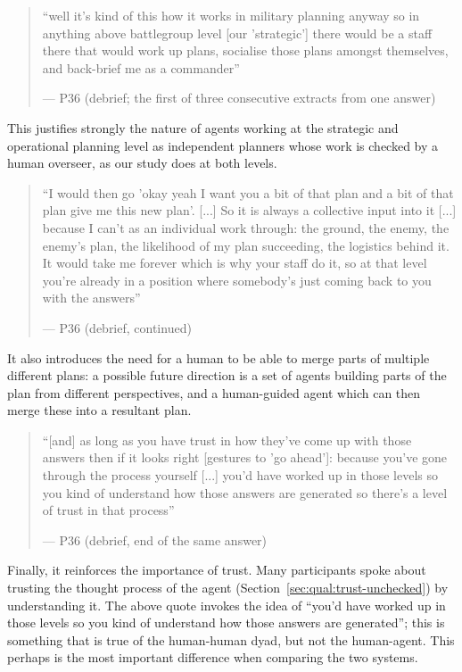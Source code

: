 \begin{quote}\small
``well it's kind of this how it works in military planning anyway so in anything above battlegroup level [our 'strategic'] there would be a staff there that would work up plans, socialise those plans amongst themselves, and back-brief me as a commander''{\color{blue}\par\hfill--- P36 (debrief; the first of three consecutive extracts from one answer)}
\end{quote}

This justifies strongly the nature of agents working at the strategic and operational planning level as independent planners whose work is checked by a human overseer, as our study does at both levels. 

\begin{quote}\small
``I would then go 'okay yeah I want you a bit of that plan and a bit of that plan give me this new plan'. [...] So it is always a collective input into it [...] because I can't as an individual work through: the ground, the enemy, the enemy's plan, the likelihood of my plan succeeding, the logistics behind it. It would take me forever which is why your staff do it, so at that level you're already in a position where somebody's just coming back to you with the answers''{\color{blue}\par\hfill--- P36 (debrief, continued)}
\end{quote}

It also introduces the need for a human to be able to merge parts of multiple different plans: a possible future direction is a set of agents building parts of the plan from different perspectives, and a human-guided agent which can then merge these into a resultant plan.

\begin{quote}\small
``[and] as long as you have trust in how they've come up with those answers then if it looks right [gestures to 'go ahead']: because you've gone through the process yourself [...] you'd have worked up in those levels so you kind of understand how those answers are generated so there's a level of trust in that process''{\color{blue}\par\hfill--- P36 (debrief, end of the same answer)}
\end{quote}

Finally, it reinforces the importance of trust. Many participants spoke about trusting the thought process of the agent (Section~\ref{sec:qual:trust-unchecked}) by understanding it. The above quote invokes the idea of ``you'd have worked up in those levels so you kind of understand how those answers are generated''; this is something that is true of the human-human dyad, but not the human-agent. This perhaps is the most important difference when comparing the two systems.

